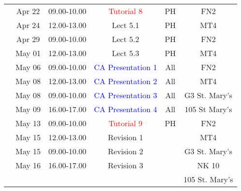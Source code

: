 \documentclass[11pt,oneside,a4paper]{article}
\begin{document}
\begin{center}
\begin{tabular}{||c||c|c|c|c|c||}
                                      &          &             &             &     &               \\
\hline\hline
\multirow{2}{*}{\color{red}{Week 41}} & Apr 22   & 09.00-10.00 & \textcolor{red}{Tutorial 8}  & PH  & FN2  \\
                                      & Apr 24   & 12.00-13.00 & Lect  5.1  & PH  & MT4   \\
\hline
\multirow{2}{*}{\color{red}{Week 42}} & Apr 29   & 09.00-10.00 & Lect  5.2  & PH   & FN2 \\
                                      & May 01   & 12.00-13.00 & Lect  5.3  & PH  & MT4  \\
\hline
\multirow{4}{*}{\color{red}{Week 43}} & May 06   & 09.00-10.00 & \textcolor{blue}{CA Presentation 1}  & All  & FN2 \\
                                      & May 08   & 12.00-13.00 & \textcolor{blue}{CA Presentation 2}  & All & MT4 \\
                                      & May 08   & 09.00-10.00 & \textcolor{blue}{CA Presentation 3}  & All & G3 St. Mary's \\
                                      & May 09   & 16.00-17.00 & \textcolor{blue}{CA Presentation 4}  & All & 105 St Mary's \\
\hline
\multirow{5}{*}{\color{red}{Week 44}} & May 13   & 09.00-10.00 & \textcolor{red}{Tutorial 9}  & PH   & FN2  \\
                                      & May 15   & 12.00-13.00 & Revision 1  &     & MT4 \\
                                      & May 15   & 09.00-10.00 & Revision 2  &     & G3 St. Mary's \\
                                      & May 16   & 16.00-17.00 & Revision 3  &     & NK 10 \\
                                      &          &             &             &     & 105 St. Mary's \\
\hline

\hline\hline

\end{tabular}
\end{center}
\end{document}
